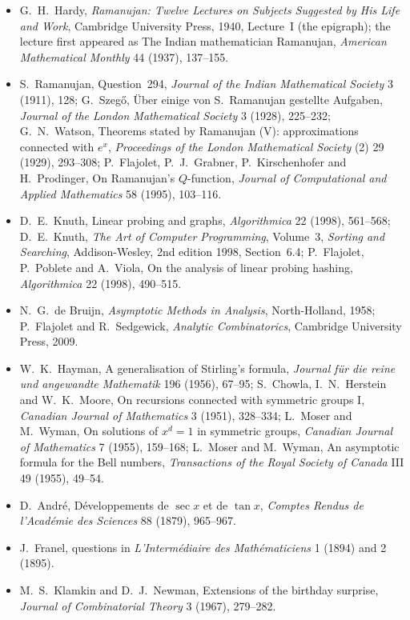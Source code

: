 \begin{itemize}
\item G.~H.~Hardy, \emph{Ramanujan: Twelve Lectures on Subjects Suggested by His Life and Work}, Cambridge University Press, 1940, Lecture~I (the epigraph); the lecture first
appeared as The Indian mathematician Ramanujan, \emph{American Mathematical Monthly} 44 (1937), 137--155.
\item S.~Ramanujan, Question~294, \emph{Journal of the Indian Mathematical Society} 3 (1911), 128; G.~Szeg\H o, \"Uber einige von S.~Ramanujan gestellte Aufgaben, \emph{Journal of the
London Mathematical Society} 3 (1928), 225--232; G.~N.~Watson, Theorems stated by Ramanujan (V): approximations connected with $e^x$, \emph{Proceedings of the London
Mathematical Society} (2) 29 (1929), 293--308; P.~Flajolet, P.~J.~Grabner, P.~Kirschenhofer and H.~Prodinger, On Ramanujan's $Q$-function, \emph{Journal of Computational and Applied
Mathematics} 58 (1995), 103--116.
\item D.~E.~Knuth, Linear probing and graphs, \emph{Algorithmica} 22 (1998), 561--568; D.~E.~Knuth, \emph{The Art of Computer Programming}, Volume~3, \emph{Sorting and Searching}, Addison-Wesley,
2nd edition 1998, Section~6.4; P.~Flajolet, P.~Poblete and A.~Viola, On the analysis of linear probing hashing, \emph{Algorithmica} 22 (1998), 490--515.
\item N.~G.~de Bruijn, \emph{Asymptotic Methods in Analysis}, North-Holland, 1958; P.~Flajolet and R.~Sedgewick, \emph{Analytic Combinatorics}, Cambridge University Press, 2009.
\item W.~K.~Hayman, A generalisation of Stirling's formula, \emph{Journal f\"ur die reine und angewandte Mathematik} 196 (1956), 67--95; S.~Chowla, I.~N.~Herstein and W.~K.~Moore, On recursions
connected with symmetric groups I, \emph{Canadian Journal of Mathematics} 3 (1951), 328--334; L.~Moser and M.~Wyman, On solutions of $x^d=1$ in symmetric groups, \emph{Canadian Journal of
Mathematics} 7 (1955), 159--168; L.~Moser and M.~Wyman, An asymptotic formula for the Bell numbers, \emph{Transactions of the Royal Society of Canada} III 49 (1955), 49--54.
\item D.~Andr\'e, D\'eveloppements de $\sec x$ et de $\tan x$, \emph{Comptes Rendus de l'Acad\'emie des Sciences} 88 (1879), 965--967.
\item J.~Franel, questions in \emph{L'Interm\'ediaire des Math\'ematiciens} 1 (1894) and 2 (1895).
\item M.~S.~Klamkin and D.~J.~Newman, Extensions of the birthday surprise, \emph{Journal of Combinatorial Theory} 3 (1967), 279--282.

\end{itemize}
